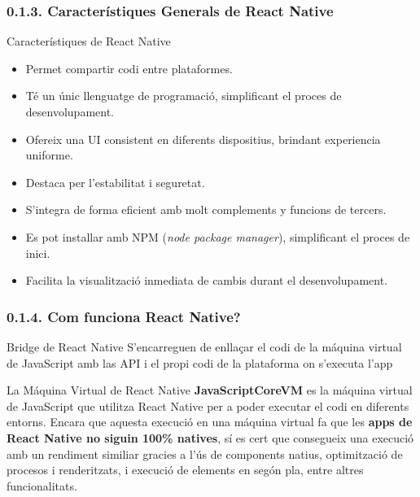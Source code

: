 \documentclass[12pt]{beamer}
\begin{document}
	\subsubsection{0.1.3. Característiques Generals de React Native}
	\begin{frame}
		\begin{block}{Característiques de React Native}
			\begin{itemize}
				\item Permet compartir codi entre plataformes.
				\item Té un únic llenguatge de programació, simplificant el proces de desenvolupament.
				\item Ofereix una UI consistent en diferents dispositius, brindant experiencia uniforme.
				\item Destaca per l'estabilitat i seguretat.
				\item S'integra de forma eficient amb molt complements y funcions de tercers.
				\item Es pot installar amb NPM (\textit{node package manager}), simplificant el proces de inici.
				\item Facilita la visualització inmediata de cambis durant el desenvolupament.
			\end{itemize}
		\end{block}
	\end{frame}
	\subsubsection{0.1.4. Com funciona React Native?}
	\begin{frame}
		\begin{block}{Bridge de React Native}
			S'encarreguen de enllaçar el codi de la máquina virtual de JavaScript amb las API i el propi codi de la plataforma on s'executa l'app
		\end{block}
		\begin{block}{La Máquina Virtual de React Native}
			\textbf{JavaScriptCoreVM} es la máquina virtual de JavaScript que utilitza React Native per a poder executar el codi en diferents entorns. Encara que aquesta execució en una máquina virtual fa que les \textbf{apps de React Native no siguin 100\% natives}, sí es cert que consegueix una execució amb un rendiment similiar gracies a l'ús de components natius, optimització de procesos i renderitzats, i execució de elements en segón pla, entre altres funcionalitats.
		\end{block}
	\end{frame}
\end{document}
